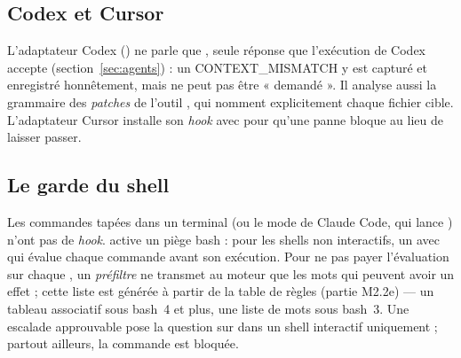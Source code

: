 \subsection{Codex et Cursor}
L'adaptateur Codex () ne parle que , seule réponse que
l'exécution de Codex accepte (section~\ref{sec:agents}) : un CONTEXT\_MISMATCH y est capturé et
enregistré honnêtement, mais ne peut pas être « demandé ». Il analyse aussi la grammaire des
\textit{patches} de l'outil , qui nomment explicitement chaque fichier
cible. L'adaptateur Cursor installe son \textit{hook} avec  pour qu'une panne
bloque au lieu de laisser passer.

\subsection{Le garde du shell}
Les commandes tapées dans un terminal (ou le mode \cmd{!} de Claude Code, qui lance
) n'ont pas de \textit{hook}.  active un piège
bash :  pour les shells non interactifs, un  avec
 qui évalue chaque commande avant son exécution. Pour ne pas payer
l'évaluation sur chaque , un \emph{préfiltre} ne transmet au moteur que les mots qui
peuvent avoir un effet ; cette liste est générée à partir de la table de règles (partie
M2.2e) --- un tableau associatif sous bash~4 et plus, une liste de mots sous bash~3. Une
escalade approuvable pose la question sur  dans un shell interactif uniquement ;
partout ailleurs, la commande est bloquée.
